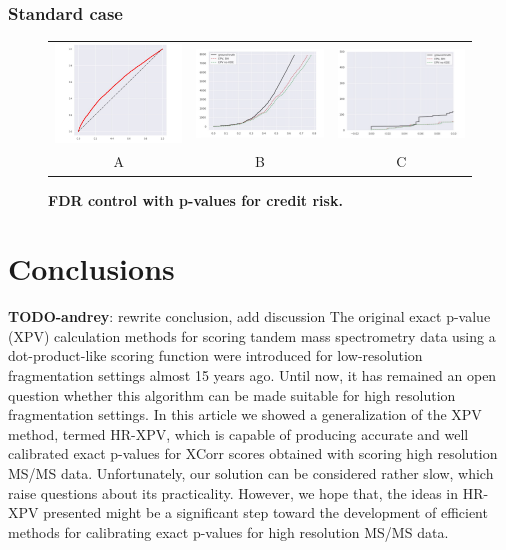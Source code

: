 \documentclass{article}
\newcommand{\todo}[2]{{\color{red} {\bf TODO-#1}: #2}}
\begin{document}
\subsubsection{Standard case}


\begin{figure}
	\centering
	\begin{tabular}{ccc}
 		\includegraphics[width=2in]{img/tinkoff_QQ.jpeg} &
		\includegraphics[width=2in]{img/tinkoff_fdr_control.png} & 
            \includegraphics[width=2in]{img/tinkoff_fdr_control_loc.png}
		\\	
		A & B & C
	\end{tabular}
	\caption{\bf FDR control with p-values for credit risk.}
	\label{fig:credit risk}
\end{figure} 

\section{Conclusions}
\todo{andrey}{rewrite conclusion, add discussion}
The original exact p-value (XPV) calculation methods for scoring tandem mass spectrometry data using a dot-product-like scoring function were introduced for low-resolution fragmentation settings almost 15 years ago. Until now, it has remained an open question whether this algorithm can be made suitable for high resolution fragmentation settings. In this article we showed a generalization of the XPV method, termed HR-XPV, which is capable of producing accurate and well calibrated exact p-values for XCorr scores obtained with scoring high resolution MS/MS data. Unfortunately, our solution can be considered rather slow, which raise questions about its practicality. However, we hope that, the ideas in HR-XPV presented might be a significant step toward the development of efficient methods for calibrating exact p-values for high resolution MS/MS data. 
\end{document}
